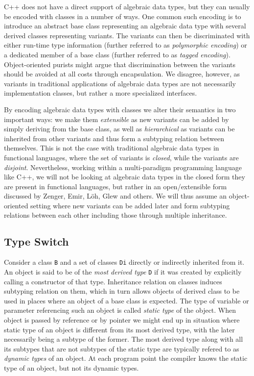 \documentclass[preprint]{sigplanconf}
\makeatletter
\DeclareRobustCommand{\code}[1]{{\lstinline[breaklines=false,escapechar=@]{#1}}}
\makeatother
\begin{document}
C++ does not have a direct support of algebraic data types, but they can usually 
be encoded with classes in a number of ways. One common such encoding is to 
introduce an abstract base class representing an algebraic data type with 
several derived classes representing variants. The variants can then be 
discriminated with either run-time type information (further referred to as 
\emph{polymorphic encoding}) or a dedicated member of a base class (further 
referred to as \emph{tagged encoding}). Object-oriented purists might argue that 
discrimination between the variants should be avoided at all costs through 
encapsulation. We disagree, however, as variants in traditional applications of 
algebraic data types are not necessarily implementation classes, but rather a 
more specialized interfaces.

By encoding algebraic data types with classes we alter their semantics in two 
important ways: we make them \emph{extensible} as new variants can be added by 
simply deriving from the base class, as well as \emph{hierarchical} as variants 
can be inherited from other variants and thus form a subtyping relation between 
themselves. This is not the case with traditional algebraic data types in 
functional languages, where the set of variants is \emph{closed}, while the 
variants are \emph{disjoint}. Nevertheless, working within a multi-paradigm 
programming language like C++, we will not be looking at algebraic data types in 
the closed form they are present in functional languages, but rather in an 
open/extensible form discussed by Zenger\cite{Zenger:2001}, Emir\cite{EmirThesis}, 
L\"oh\cite{LohHinze2006}, Glew\cite{Glew99} and others. We will thus 
assume an object-oriented setting where new variants can be added later and form
subtyping relations between each other including those through multiple 
inheritance.

\subsection{Type Switch}

Consider a class \code{B} and a set of classes \code{Di} directly or indirectly 
inherited from it. An object is said to be of the \emph{most derived type} 
\code{D} if it was created by explicitly calling a constructor of that type.
Inheritance relation on classes induces subtyping relation on them, which in 
turn allows objects of derived class to be used in places where an object of a 
base class is expected. The type of variable or parameter referencing such an
object is called \emph{static type} of the object. When object is passed by 
reference or by pointer we might end up in situation where static type of an 
object is different from its most derived type, with the later necessarily 
being a subtype of the former. The most derived type along with all its subtypes 
that are not subtypes of the static type are typically refered to as 
\emph{dynamic types} of an object. At each program point the compiler knows the 
static type of an object, but not its dynamic types.
\end{document}
